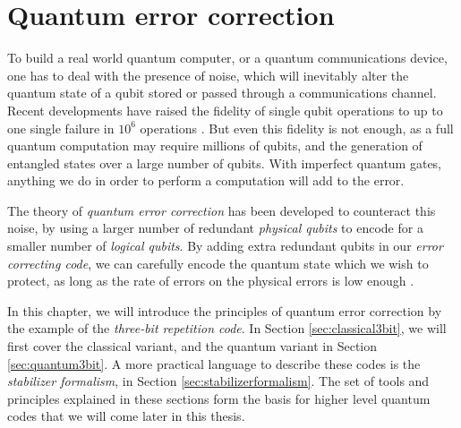 \chapter{Quantum error correction}\label{ch:qec}

To build a real world quantum computer, or a quantum communications device, one has to deal with the presence of noise, which will inevitably alter the quantum state of a qubit stored or passed through a communications channel. Recent developments have raised the fidelity of single qubit operations to up to one single failure in $10^6$ operations \cite{ballance2016high}. But even this fidelity is not enough, as a full quantum computation may require millions of qubits, and the generation of entangled states over a large number of qubits. With imperfect quantum gates, anything we do in order to perform a computation will add to the error. 

The theory of \emph{quantum error correction} has been developed to counteract this noise, by using a larger number of redundant \emph{physical qubits} to encode for a smaller number of \emph{logical qubits}. By adding extra redundant qubits in our \emph{error correcting code}, we can carefully encode the quantum state which we wish to protect, as long as the rate of errors on the physical errors is low enough \cite{calderbank1996good, steane1996multiple, preskill1998reliable}.

In this chapter, we will introduce the principles of quantum error correction by the example of the \emph{three-bit repetition code}. In Section \ref{sec:classical3bit}, we will first cover the classical variant, and the quantum variant in Section \ref{sec:quantum3bit}. A more practical language to describe these codes is the \emph{stabilizer formalism}, in Section \ref{sec:stabilizerformalism}. The set of tools and principles explained in these sections form the basis for higher level quantum codes that we will come later in this thesis.

